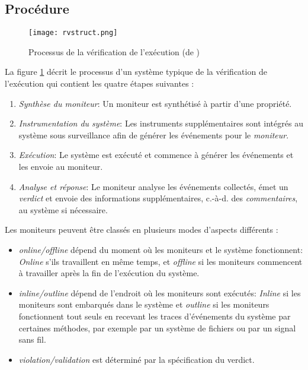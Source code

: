 \subsection{Procédure}

\begin{figure}[h]
\begin{center}
\centering
\texttt{[image: rvstruct.png]}
\caption{Processus de la vérification de l'exécution (de \cite{falcone2013tutorial})}
\label{img:rvstruct}
\end{center}
\end{figure}

La figure \ref{img:rvstruct} décrit le processus d'un système typique de la vérification de l'exécution qui contient les quatre étapes suivantes \citep{falcone2013tutorial}:
\begin{enumerate}
\item \emph{Synthèse du moniteur}: Un moniteur est synthétisé à partir d'une propriété.
\item \emph{Instrumentation du système}: Les instruments supplémentaires sont intégrés au système sous surveillance afin de générer les événements pour le \emph{moniteur}.
\item \emph{Exécution}: Le système est exécuté et commence à générer les événements et les envoie au moniteur.
\item \emph{Analyse et réponse}: Le moniteur analyse les événements collectés, émet un \emph{verdict} et envoie des informations supplémentaires, c.-à-d. des \emph{commentaires}, au système si nécessaire.
\end{enumerate}

Les moniteurs peuvent être classés en plusieurs modes d'aspects différents \citep{chen2007mop}:
\begin{itemize}
\item \emph{online/offline} dépend du moment où les moniteurs et le système fonctionnent: \emph{Online} s'ils travaillent en même temps, et \emph{offline} si les moniteurs commencent à travailler après la fin de l'exécution du système.
\item \emph{inline/outline} dépend de l'endroit où les moniteurs sont exécutés: \emph{Inline} si les moniteurs sont embarqués dans le système et \emph{outline} si les moniteurs fonctionnent tout seuls en recevant les traces d'événements du système par certaines méthodes, par exemple par un système de fichiers ou par un signal sans fil.
\item \emph{violation/validation} est déterminé par la spécification du verdict.
\end{itemize}

